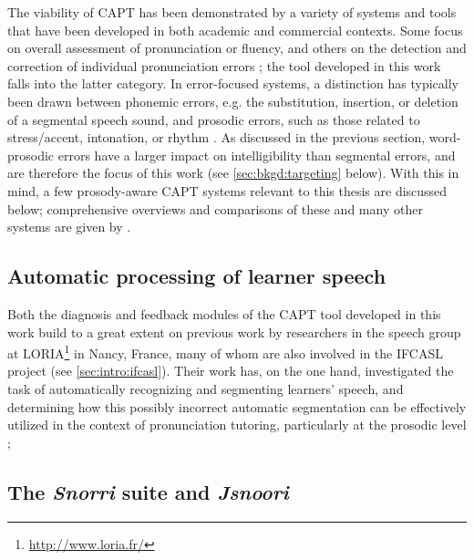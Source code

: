 	The viability of CAPT has been demonstrated by a variety of systems and tools that have been developed in both academic and commercial contexts. Some focus on overall assessment of pronunciation or fluency, and others on the detection and correction of individual pronunciation errors \citep{Eskenazi2009}; the tool developed in this work falls into the latter category. In error-focused systems, a distinction has typically been drawn between phonemic errors, e.g. the substitution, insertion, or deletion of a segmental speech sound, and prosodic errors, such as those related to stress/accent, intonation, or rhythm \citep{Witt2012}. As discussed in the previous section, word-prosodic errors have a larger impact on intelligibility than segmental errors, and are therefore the focus of this work (see \cref{sec:bkgd:targeting} below). With this in mind, a few prosody-aware CAPT systems relevant to this thesis are discussed below; comprehensive overviews and comparisons of these and many other systems are given by \textcite{Neri2002,Eskenazi2009,Delmonte2011,Witt2012}.  
	
	\subsection{Automatic processing of learner speech}
		
	Both the diagnosis and feedback modules of the CAPT tool developed in this work build to a great extent on previous work by researchers in the speech group at LORIA\footnote{\url{http://www.loria.fr/}} in Nancy, France, many of whom are also involved in the IFCASL project (see \cref{sec:intro:ifcasl}). 
	 Their work has, on the one hand, investigated the task of automatically recognizing and segmenting learners' speech, and determining how this possibly incorrect automatic segmentation can be effectively utilized in the context of pronunciation tutoring, particularly at the prosodic level \citep{Mesbahi2011,Orosanu2012}; 
	
	\subsection{The \textit{Snorri} suite and \textit{Jsnoori}}
	\label{sec:capt:snoori}
	
